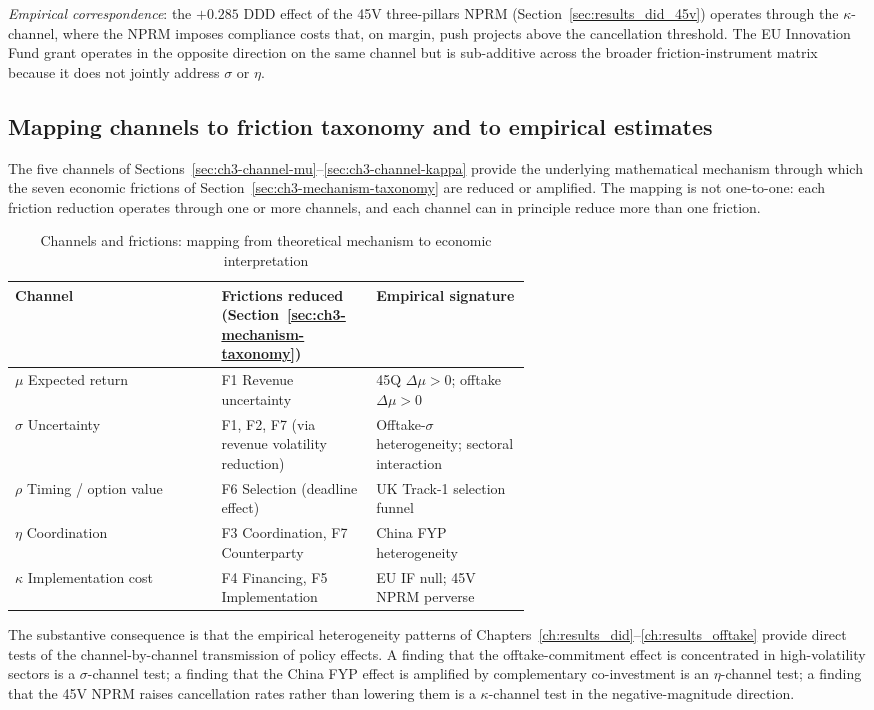 \emph{Empirical correspondence}: the $+0.285$ DDD effect of the 45V three-pillars NPRM (Section~\ref{sec:results_did_45v}) operates through the $\kappa$-channel, where the NPRM imposes compliance costs that, on margin, push projects above the cancellation threshold. The EU Innovation Fund grant operates in the opposite direction on the same channel but is sub-additive across the broader friction-instrument matrix because it does not jointly address $\sigma$ or $\eta$.

\subsection{Mapping channels to friction taxonomy and to empirical estimates}
\label{sec:ch3-channels-table}

The five channels of Sections~\ref{sec:ch3-channel-mu}--\ref{sec:ch3-channel-kappa} provide the underlying mathematical mechanism through which the seven economic frictions of Section~\ref{sec:ch3-mechanism-taxonomy} are reduced or amplified. The mapping is not one-to-one: each friction reduction operates through one or more channels, and each channel can in principle reduce more than one friction.

\begin{table}[!htbp]
\centering
\caption{Channels and frictions: mapping from theoretical mechanism to economic interpretation}
\label{tab:ch3-channels-frictions}
\small
\begin{tabular}{lp{0.30\linewidth}p{0.30\linewidth}}
\toprule
Channel & Frictions reduced (Section~\ref{sec:ch3-mechanism-taxonomy}) & Empirical signature \\
\midrule
$\mu$ Expected return & F1 Revenue uncertainty & 45Q $\Delta\mu > 0$; offtake $\Delta\mu > 0$ \\
$\sigma$ Uncertainty & F1, F2, F7 (via revenue volatility reduction) & Offtake-$\sigma$ heterogeneity; sectoral interaction \\
$\rho$ Timing / option value & F6 Selection (deadline effect) & UK Track-1 selection funnel \\
$\eta$ Coordination & F3 Coordination, F7 Counterparty & China FYP heterogeneity \\
$\kappa$ Implementation cost & F4 Financing, F5 Implementation & EU IF null; 45V NPRM perverse \\
\bottomrule
\end{tabular}
\end{table}

The substantive consequence is that the empirical heterogeneity patterns of Chapters~\ref{ch:results_did}--\ref{ch:results_offtake} provide direct tests of the channel-by-channel transmission of policy effects. A finding that the offtake-commitment effect is concentrated in high-volatility sectors is a $\sigma$-channel test; a finding that the China FYP effect is amplified by complementary co-investment is an $\eta$-channel test; a finding that the 45V NPRM raises cancellation rates rather than lowering them is a $\kappa$-channel test in the negative-magnitude direction.

